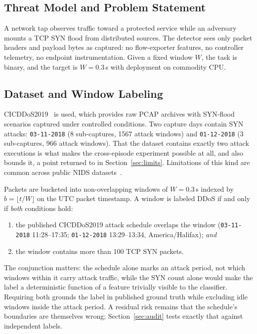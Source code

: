 \documentclass[conference]{IEEEtran} \IEEEoverridecommandlockouts
\begin{document}
\subsection{Threat Model and Problem Statement} A network tap observes traffic toward a protected service while an adversary
mounts a TCP SYN flood from distributed sources. The detector sees only packet
headers and payload bytes as captured: no flow-exporter features, no controller
telemetry, no endpoint instrumentation. Given a fixed window $W$, the task is
binary, and the target is $W = 0.3$\,s with deployment on commodity CPU.

\subsection{Dataset and Window Labeling}
CICDDoS2019~\cite{sharafaldin2019ddos} is used, which provides raw
PCAP archives with SYN-flood scenarios captured under controlled conditions.
Two capture days contain SYN attacks: \texttt{03-11-2018} (8 sub-captures, 1567
attack windows) and \texttt{01-12-2018} (3 sub-captures, 966 attack windows).
That the dataset contains exactly two attack executions is what makes the cross-episode experiment possible at all, and also bounds it, a point returned to in Section~\ref{sec:limits}. Limitations of this kind are common across public NIDS datasets~\cite{goldschmidt2025datasets}.

Packets are bucketed into non-overlapping windows of $W = 0.3$\,s indexed by
$b = \lfloor t/W \rfloor$ on the UTC packet timestamp. A window is labeled DDoS
if and only if \emph{both} conditions hold:
\begin{enumerate}
  \item the published CICDDoS2019 attack schedule overlaps the window
        (\texttt{03-11-2018} 11:28--17:35; \texttt{01-12-2018} 13:29--13:34,
        America/Halifax); \emph{and}
  \item the window contains more than 100 TCP SYN packets.
\end{enumerate}

The conjunction matters: the schedule alone marks an attack period, not which
windows within it carry attack traffic, while the SYN count alone would make
the label a deterministic function of a feature trivially visible to the
classifier. Requiring both grounds the label in published ground truth while
excluding idle windows inside the attack period. A residual risk
remains that the schedule's boundaries are themselves wrong;
Section~\ref{sec:audit} tests exactly that against independent labels.
\end{document}
